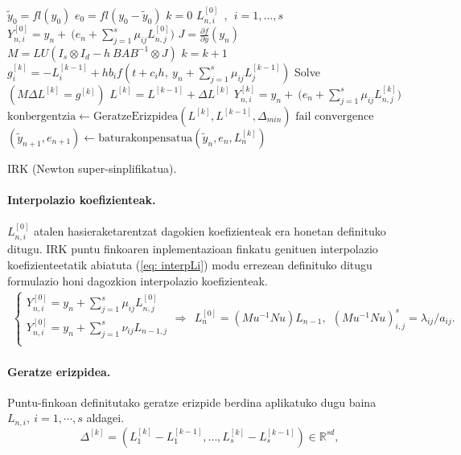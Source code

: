 \begin{algorithm}[h!]
 \BlankLine
  $\tilde{y}_0=fl(y_0)$\;
  $e_0=fl(y_0-\tilde{y}_0)$\;
  {
   \BlankLine
   $k=0$\;
     $L_{n,i}^{[0]} \ \ , \ \ i=1,\dots,s $\;
   $Y_{n,i}^{[0]}=y_{n} + \ \big(e_n+\sum\limits_{j=1}^{s} \mu_{ij} L_{n,j}^{[0]}\big)  $\;
   \BlankLine
   $J=\frac{\partial f}{\partial y}(y_n) $\; 
   $M=LU(I_s \otimes I_d - h \ BAB^{-1} \otimes J)$\;
   \BlankLine
   {
    \BlankLine 
    $k=k+1$\;
    $g_i^{[k]}=-L_i^{[k-1]}+h b_i f(t+c_ih,\ y_n+ \sum\limits_{j=1}^{s} \mu_{ij} L_{j}^{[k-1]})$\;
    Solve $(M \Delta L^{[k]}=g^{[k]})$\;
    $L^{[k]}=L^{[k-1]}+\Delta L^{[k]}$\;
    $Y_{n,i}^{[k]}=y_{n} + \ \big(e_n+\sum\limits_{j=1}^{s} \mu_{ij} L_{n,j}^{[k]}\big)  $\;
    $\text{konbergentzia} \leftarrow \text{GeratzeErizpidea}(L^{[k]},L^{[k-1]},\Delta_{min}) $\;
   }
   \BlankLine
   {
    {$\text{fail convergence}$\;}
   }
   $(\tilde y_{n+1}, e_{n+1})\leftarrow \text{baturakonpensatua}(\tilde y_{n},e_{n},L_{n}^{[k]})$\;
 }
 \caption{IRK (Newton super-sinplifikatua).}
 \label{alg:nssli}
\end{algorithm}

\paragraph*{Interpolazio koefizienteak.} $L_{n,i}^{[0]}$ atalen hasieraketarentzat dagokien koefizienteak era honetan definituko ditugu. IRK puntu finkoaren inplementazioan finkatu genituen interpolazio koefizienteetatik abiatuta (\ref{eq: interpLi}) modu errezean definituko ditugu formulazio honi dagozkion interpolazio koefizienteak.
\begin{align}
\left \{ \begin{array}{c}
  Y_{n,i}^{[0]}=y_n+\sum_{j=1}^{s} \mu_{ij} L_{n,j}^{[0]} \\[.25cm]
  Y_{n,i}^{[0]}=y_n+\sum_{j=1}^{s} \nu_{ij} L_{n-1,j} \\
          \end{array} \right. 
\Rightarrow \ \ L_n^{{[0]}}=(Mu^{-1} Nu) L_{n-1}, \ \ (Mu^{-1} Nu)_{i,j}^{s}=\lambda_{ij}/a_{ij}.
\end{align}

\paragraph*{Geratze erizpidea.} Puntu-finkoan definitutako geratze erizpide berdina aplikatuko dugu baina $L_{n,i}, \ i=1,\cdots,s$ aldagei.
\begin{equation*}
\Delta^{[k]}=(L_1^{[k]}-L_1^{[k-1]},\dots,L_s^{[k]}-L_s^{[k-1]}) \in \mathbb{R}^{sd},
\end{equation*}

